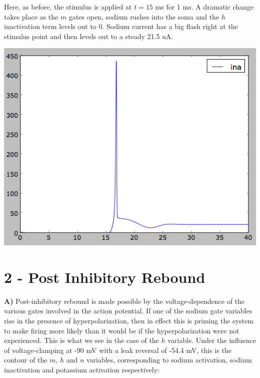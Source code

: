 \documentclass[12pt]{article}
\begin{document}
Here, as before, the stimulus is applied at $t=15$ ms for 1 ms.  A dramatic change takes place as the $m$ gates open, sodium rushes into the soma and the $h$ inactivation term levels out to 0.  Sodium current has a big flash right at the stimulus point and then levels out to a steady 21.5 uA.  

\vspace{10pt}
\includegraphics[scale=0.54]{nacurrent.png}
\vspace{10pt}

\section{2 - Post Inhibitory Rebound}

{\bf A)}  Post-inhibitory rebound is made possible by the voltage-dependence of the various gates involved in the action potential.  If one of the sodium gate variables rise in the presence of hyperpolarization, then in effect this is priming the system to make firing more likely than it would be if the hyperpolarization were not experienced.  This is what we see in the case of the $h$ variable.  Under the influence of voltage-clamping at -90 mV with a leak reversal of -54.4 mV, this is the contour of the $m$, $h$ and $n$ variables, corresponding to sodium activation, sodium inactivation and potassium activation respectively:
\end{document}
